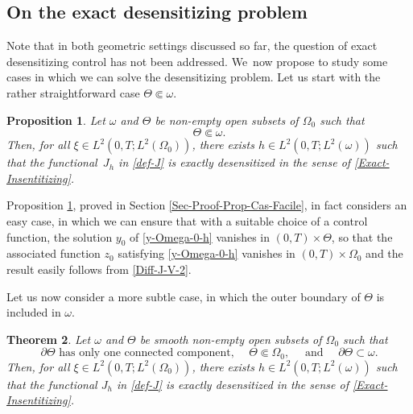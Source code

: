 \documentclass[JEP,XML,SOM,Unicode,NoFloatCountersInSection]{cedram}
\newcounter{question}
\newtheorem{theorem}{Theorem}[section]
\newtheorem{proposition}[theorem]{Proposition}
\theoremstyle{definition}
\begin{document}
\subsection*{On the exact desensitizing problem}

Note that in both geometric settings discussed so far, the question of exact desensitizing control has not been addressed. We~now propose to study some cases in which we can solve the desensitizing problem. Let us start with the rather straightforward case $ \Theta \Subset \omega$.

\begin{proposition}
\label{Prop-Cas-Facile}
Let $\omega$ and $\Theta$ be non-empty open subsets of $\Omega_0$ such that
\begin{equation}
\label{Assumption-EasyCase}
\Theta \Subset \omega.
\end{equation}
Then, for all $\xi\!\in\! L^2(0,T; L^2(\Omega_0))$, there exists $h\!\in\! L^2(0,T; L^2(\omega))$ such that the func\-tional~$J_h$ in \eqref{def-J} is exactly desensitized in the sense of \eqref{Exact-Insentitizing}.
\end{proposition}

Proposition \ref{Prop-Cas-Facile}, proved in Section \ref{Sec-Proof-Prop-Cas-Facile}, in fact considers an easy case, in which we can ensure that with a suitable choice of a control function, the solution $y_0$ of \eqref{y-Omega-0-h} vanishes in $(0,T) \times \Theta$, so that the associated function $z_0$ {satisfying} \eqref{y-Omega-0-h} vanishes in $(0,T) \times \Omega_0$ and the result easily follows from \eqref{Diff-J-V-2}.

Let us now consider a more subtle case, in which the outer boundary of $\Theta$ is included in $\omega$.

\begin{theorem}
\label{Thm-insensitizing-Boundary}
Let $\omega$ and $\Theta$ be smooth non-empty open subsets of $\Omega_0$ such that
\begin{equation}
\label{Assumption-insensitizing-Boundary}
\partial \Theta \text{ has only one connected component, } \quad \Theta \Subset \Omega_0, \quad \text{ and } \quad \partial \Theta \subset \omega.
\end{equation}
Then, for all $\xi \in L^2(0,T; L^2(\Omega_0))$, there exists $h \in L^2(0,T; L^2(\omega))$ such that the functional $J_h$ in \eqref{def-J} is exactly desensitized in the sense of \eqref{Exact-Insentitizing}.
\end{theorem}
\end{document}
